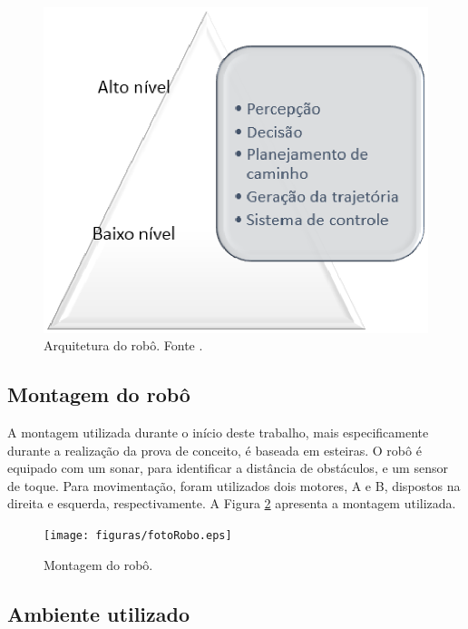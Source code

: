 		\begin{figure}[H]
			\centering
			\includegraphics[scale=0.5]{figuras/camadas.eps}
			\caption[Arquitetura do robô]{Arquitetura do robô. Fonte \cite{vieira}.}
			\label{img:camadas}
		\end{figure}

	\subsection{Montagem do robô} %
	\label{sub:montagem_do_robô}
		
		A montagem utilizada durante o início deste trabalho, mais especificamente durante a realização da prova de conceito, é baseada em esteiras. O robô é equipado com um sonar, para identificar a distância de obstáculos, e um sensor de toque. Para movimentação, foram utilizados dois motores, A e B, dispostos na direita e esquerda, respectivamente. A Figura \ref{img:fotoRobo} apresenta a montagem utilizada.

		\begin{figure}[H]
			\centering
			\texttt{[image: figuras/fotoRobo.eps]}
			\caption[Montagem do robô]{Montagem do robô.}
			\label{img:fotoRobo}
		\end{figure}

	\subsection{Ambiente utilizado} %
	\label{sub:ambiente_utilizado}
		
